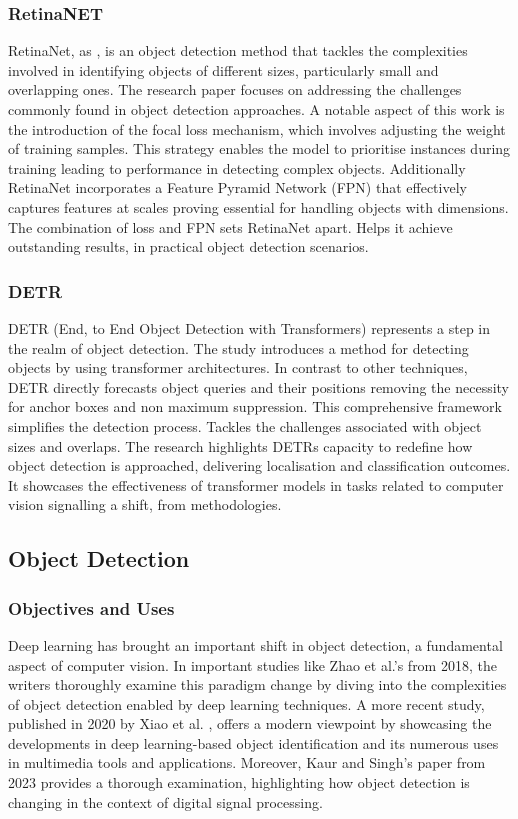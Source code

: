 \documentclass{IEEEtran}
\begin{document}
	\subsubsection{RetinaNET}
	RetinaNet, as \cite{RetinaNet}, is an object detection method that tackles the complexities involved in identifying objects of different sizes, particularly small and overlapping ones. The research paper focuses on addressing the challenges commonly found in object detection approaches. A notable aspect of this work is the introduction of the focal loss mechanism, which involves adjusting the weight of training samples. This strategy enables the model to prioritise instances during training leading to performance in detecting complex objects. Additionally RetinaNet incorporates a Feature Pyramid Network (FPN) that effectively captures features at scales proving essential for handling objects with dimensions. The combination of loss and FPN sets RetinaNet apart. Helps it achieve outstanding results, in practical object detection scenarios.
	
	\subsubsection{DETR}
	DETR (End, to End Object Detection with Transformers) represents a step in the realm of object detection. The study \cite{DETR} introduces a method for detecting objects by using transformer architectures. In contrast to other techniques, DETR directly forecasts object queries and their positions removing the necessity for anchor boxes and non maximum suppression. This comprehensive framework simplifies the detection process. Tackles the challenges associated with object sizes and overlaps. The research highlights DETRs capacity to redefine how object detection is approached, delivering localisation and classification outcomes. It showcases the effectiveness of transformer models in tasks related to computer vision signalling a shift, from methodologies.
	
	\subsection{Object Detection}
	\subsubsection{Objectives and Uses}
	Deep learning has brought an important shift in object detection, a fundamental aspect of computer vision. In important studies like Zhao et al.'s \cite{ObjDetReview} from 2018, the writers thoroughly examine this paradigm change by diving into the complexities of object detection enabled by deep learning techniques. A more recent study, published in 2020 by Xiao et al. \cite{ObjDetReview2}, offers a modern viewpoint by showcasing the developments in deep learning-based object identification and its numerous uses in multimedia tools and applications. Moreover, Kaur and Singh's paper \cite{ObjDetReview3} from 2023 provides a thorough examination, highlighting how object detection is changing in the context of digital signal processing. 
	
\end{document}
